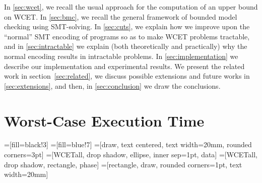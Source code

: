 \documentclass[a4paper,twocolumn,11pt]{article}
\begin{document}
In \autoref{sec:wcet}, we recall the usual approach for the computation of an upper bound on WCET. In \autoref{sec:bmc}, we recall the general framework of bounded model checking using SMT-solving. In \autoref{sec:cuts}, we explain how we improve upon the ``normal'' SMT encoding of programs so as to make WCET problems tractable, and in \autoref{sec:intractable} we explain (both theoretically and practically) why the normal encoding results in intractable problems. In \autoref{sec:implementation} we describe our implementation and experimental results. We present the related work in section~\ref{sec:related}, we discuss possible extensions and future works in \autoref{sec:extensions}, and then, in \autoref{sec:conclusion} we draw the conclusions.

\section{Worst-Case Execution Time}
\label{sec:wcet}

\newcommand{\uAA}{Micro-architectural Analysis}
=[fill=black!3]
=[fill=blue!7]
  =[draw, text centered, text width=20mm, rounded corners=3pt]
 =[WCETall, drop shadow, ellipse, inner sep=1pt, data]
=[WCETall, drop shadow, rectangle, phase]
   =[rectangle, draw, rounded corners=1pt, text width=20mm]
\end{document}
